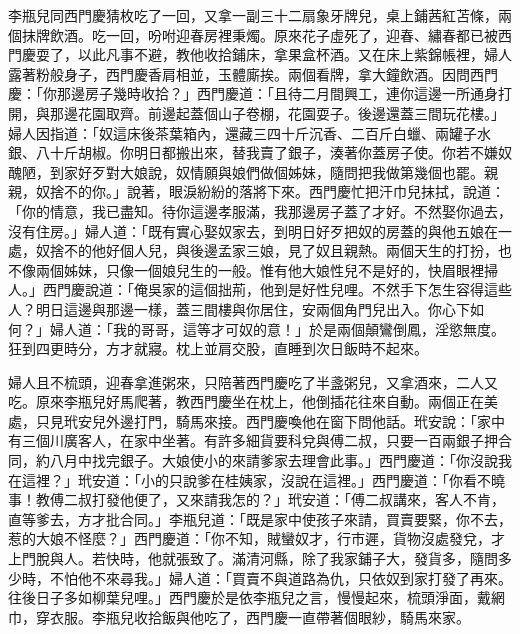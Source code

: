 李瓶兒同西門慶猜枚吃了一回，又拿一副三十二扇象牙牌兒，桌上鋪茜紅苫條，兩個抹牌飲酒。吃一回，吩咐迎春房裡秉燭。原來花子虛死了，迎春、繡春都已被西門慶耍了，以此凡事不避，教他收拾鋪床，拿果盒杯酒。又在床上紫錦帳裡，婦人露著粉般身子，西門慶香肩相並，玉體廝挨。兩個看牌，拿大鐘飲酒。因問西門慶：「你那邊房子幾時收拾？」西門慶道：「且待二月間興工，連你這邊一所通身打開，與那邊花園取齊。前邊起蓋個山子卷棚，花園耍子。後邊還蓋三間玩花樓。」婦人因指道：「奴這床後茶葉箱內，還藏三四十斤沉香、二百斤白蠟、兩罐子水銀、八十斤胡椒。你明日都搬出來，替我賣了銀子，湊著你蓋房子使。你若不嫌奴醜陋，到家好歹對大娘說，奴情願與娘們做個姊妹，隨問把我做第幾個也罷。親親，奴捨不的你。」說著，眼淚紛紛的落將下來。西門慶忙把汗巾兒抹拭，說道：「你的情意，我已盡知。待你這邊孝服滿，我那邊房子蓋了才好。不然娶你過去，沒有住房。」婦人道：「既有實心娶奴家去，到明日好歹把奴的房蓋的與他五娘在一處，奴捨不的他好個人兒，與後邊孟家三娘，見了奴且親熱。兩個天生的打扮，也不像兩個姊妹，只像一個娘兒生的一般。惟有他大娘性兒不是好的，快眉眼裡掃人。」西門慶說道：「俺吳家的這個拙荊，他到是好性兒哩。不然手下怎生容得這些人？明日這邊與那邊一樣，蓋三間樓與你居住，安兩個角門兒出入。你心下如何？」婦人道：「我的哥哥，這等才可奴的意！」於是兩個顛鸞倒鳳，淫慾無度。狂到四更時分，方才就寢。枕上並肩交股，直睡到次日飯時不起來。

婦人且不梳頭，迎春拿進粥來，只陪著西門慶吃了半盞粥兒，又拿酒來，二人又吃。原來李瓶兒好馬爬著，教西門慶坐在枕上，他倒插花往來自動。兩個正在美處，只見玳安兒外邊打門，騎馬來接。西門慶喚他在窗下問他話。玳安說：「家中有三個川廣客人，在家中坐著。有許多細貨要科兌與傅二叔，只要一百兩銀子押合同，約八月中找完銀子。大娘使小的來請爹家去理會此事。」西門慶道：「你沒說我在這裡？」玳安道：「小的只說爹在桂姨家，沒說在這裡。」西門慶道：「你看不曉事！教傅二叔打發他便了，又來請我怎的？」玳安道：「傅二叔講來，客人不肯，直等爹去，方才批合同。」李瓶兒道：「既是家中使孩子來請，買賣要緊，你不去，惹的大娘不怪麼？」西門慶道：「你不知，賊蠻奴才，行市遲，貨物沒處發兌，才上門脫與人。若快時，他就張致了。滿清河縣，除了我家鋪子大，發貨多，隨問多少時，不怕他不來尋我。」婦人道：「買賣不與道路為仇，只依奴到家打發了再來。往後日子多如柳葉兒哩。」西門慶於是依李瓶兒之言，慢慢起來，梳頭淨面，戴網巾，穿衣服。李瓶兒收拾飯與他吃了，西門慶一直帶著個眼紗，騎馬來家。

